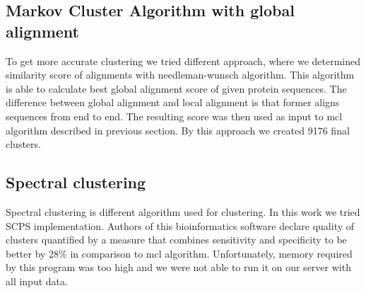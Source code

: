 \subsection{Markov Cluster Algorithm with global alignment}
To get more accurate clustering we tried different approach, where we determined similarity score of alignments with needleman-wunsch algorithm. \cite{needleman-wunsch}
This algorithm is able to calculate best global alignment score of given protein sequences.
The difference between global alignment and local alignment is that former aligns sequences from end to end.
The resulting score was then used as input to mcl algorithm described in previous section.
By this approach we created 9176 final clusters.

\subsection{Spectral clustering}
Spectral clustering is different algorithm used for clustering.
In this work we tried SCPS implementation\cite{scps}.
Authors of this bioinformatics software declare quality of clusters quantified by a measure that combines sensitivity and specificity to be better by 28\% in comparison to mcl algorithm.
Unfortunately, memory required by this program was too high and we were not able to run it on our server with all input data. 

